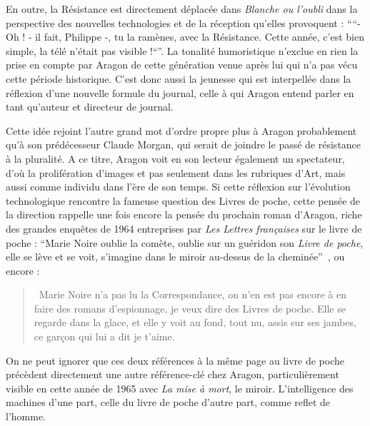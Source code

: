 	 En outre, la Résistance est directement déplacée dans \emph{Blanche ou l’oubli} dans la perspective des nouvelles technologies et de la réception qu’elles provoquent : \enquote{“- Oh ! - il fait, Philippe -, tu la ramènes, avec la Résistance. Cette année, c’est bien simple, la télé n’était pas visible !“}. La tonalité humoristique n’exclue en rien la prise en compte par Aragon de cette génération venue après lui qui n’a pas vécu cette période historique. C’est donc aussi la jeunesse qui est interpellée dans la réflexion d’une nouvelle formule du journal, celle à qui Aragon entend parler en tant qu’auteur et directeur de journal. 

	Cette idée rejoint l’autre grand mot d’ordre propre plus à Aragon probablement qu’à son prédécesseur Claude Morgan, qui serait de joindre le passé de résistance à la pluralité. A ce titre, Aragon voit en son lecteur également un spectateur, d’où la prolifération d’images et pas seulement dans les rubriques d’Art, mais aussi comme individu dans l’ère de son temps. Si cette réflexion sur l’évolution technologique rencontre la fameuse question des Livres de poche, cette pensée de la direction rappelle une fois encore la pensée du prochain roman d’Aragon, riche des grandes enquêtes de 1964 entreprises par \emph{Les Lettres françaises} sur le livre de poche : \enquote{Marie Noire oublie la comète, oublie sur un guéridon son \emph{Livre de poche}, elle se lève et se voit, s’imagine dans le miroir au-dessus de la cheminée} , ou encore :
	\begin{quote}
	 Marie Noire n’a pas lu la Correspondance, on n’en est pas encore à en faire des romans d’espionnage, je veux dire des Livres de poche. Elle se regarde dans la glace, et elle y voit au fond, tout nu, assis sur ses jambes, ce garçon qui lui a dit je t’aime. 	
	\end{quote}


	  On ne peut ignorer que ces deux références à la même page au livre de poche précèdent directement une autre référence-clé chez Aragon, particulièrement visible en cette année de 1965 avec \emph{La mise à mort}, le miroir. L’intelligence des machines d’une part, celle du livre de poche d’autre part, comme reflet de l’homme. 


